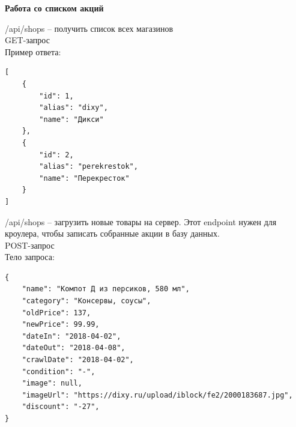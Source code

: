 \textbf{Работа со списком акций}

\noindent
/api/shops -- получить список всех магазинов\\
GET-запрос\\
Пример ответа:
\begin{verbatim}
[
    {
        "id": 1,
        "alias": "dixy",
        "name": "Дикси"
    },
    {
        "id": 2,
        "alias": "perekrestok",
        "name": "Перекресток"
    }
]
\end{verbatim}

\noindent
/api/shops -- загрузить новые товары на сервер. Этот endpoint нужен для
кроулера, чтобы записать собранные акции в базу данных. \\
POST-запрос\\
Тело запроса:
\begin{verbatim}
{
    "name": "Компот Д из персиков, 580 мл",
    "category": "Консервы, соусы",
    "oldPrice": 137,
    "newPrice": 99.99,
    "dateIn": "2018-04-02",
    "dateOut": "2018-04-08",
    "crawlDate": "2018-04-02",
    "condition": "-",
    "image": null,
    "imageUrl": "https://dixy.ru/upload/iblock/fe2/2000183687.jpg",
    "discount": "-27",
}
\end{verbatim}

